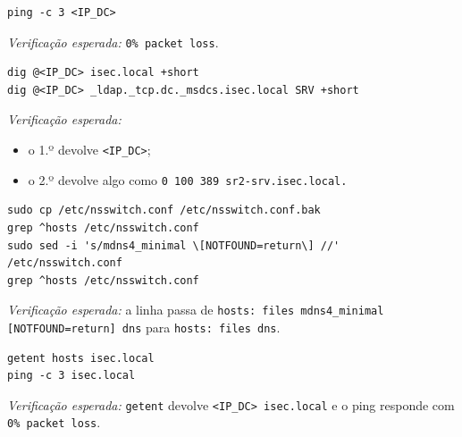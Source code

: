 
\begin{lstlisting}[style=bashstyle]
ping -c 3 <IP_DC>
\end{lstlisting}

\emph{Verificação esperada:} \texttt{0\% packet loss}.


\begin{lstlisting}[style=bashstyle]
dig @<IP_DC> isec.local +short
dig @<IP_DC> _ldap._tcp.dc._msdcs.isec.local SRV +short
\end{lstlisting}

\emph{Verificação esperada:}

\begin{itemize}
\item o 1.º devolve \texttt{\textless{}IP\_DC\textgreater{}};
\item o 2.º devolve algo como \texttt{0 100 389 sr2-srv.isec.local.}
\end{itemize}


\begin{lstlisting}[style=bashstyle]
sudo cp /etc/nsswitch.conf /etc/nsswitch.conf.bak
grep ^hosts /etc/nsswitch.conf
sudo sed -i 's/mdns4_minimal \[NOTFOUND=return\] //' /etc/nsswitch.conf
grep ^hosts /etc/nsswitch.conf
\end{lstlisting}

\emph{Verificação esperada:} a linha passa de \texttt{hosts: files mdns4\_minimal [NOTFOUND=return] dns} para \texttt{hosts: files dns}.


\begin{lstlisting}[style=bashstyle]
getent hosts isec.local
ping -c 3 isec.local
\end{lstlisting}

\emph{Verificação esperada:} \texttt{getent} devolve \texttt{\textless{}IP\_DC\textgreater{} isec.local} e o ping responde com \texttt{0\% packet loss}.

